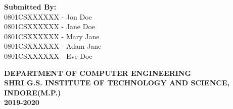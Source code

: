 \begin{titlepage}
\begin{minipage}[t]{0.45\textwidth}
    
    \textbf{Submitted By: \\}
    0801CSXXXXXX - Jon Doe       \\
    0801CSXXXXXX - Jane Doe      \\
    0801CSXXXXXX - Mary Jane     \\
    0801CSXXXXXX - Adam Jane     \\
    0801CSXXXXXX - Eve Doe       \\
    \end{minipage}
    
    \vspace*{\fill}

    \large
    \textbf{DEPARTMENT OF COMPUTER ENGINEERING \\
    SHRI G.S. INSTITUTE OF TECHNOLOGY AND SCIENCE, INDORE(M.P.)\\
    2019-2020
    }
\end{titlepage}